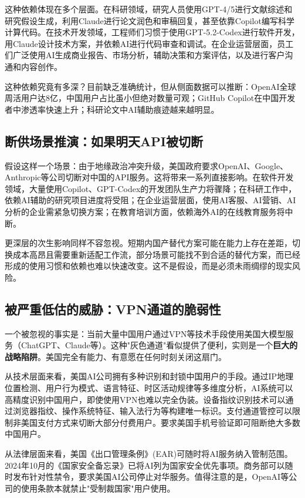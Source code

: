 这种依赖体现在多个层面。在科研领域，研究人员使用GPT-4/5进行文献综述和研究假设生成，利用Claude进行论文润色和审稿回复，甚至依靠Copilot编写科学计算代码。在技术开发领域，工程师们习惯于使用GPT-5.2-Codex进行软件开发，用Claude设计技术方案，并依赖AI进行代码审查和调试。在企业运营层面，员工们广泛使用AI生成商业报告、市场分析，辅助决策和方案评估，以及进行客户沟通和内容创作。

这种依赖究竟有多深？目前缺乏准确统计，但从侧面数据可以推断：OpenAI全球周活用户达8亿，中国用户占比虽小但绝对数量可观；GitHub Copilot在中国开发者中渗透率快速上升；科研论文中AI辅助痕迹越来越明显。

\subsection{断供场景推演：如果明天API被切断}

假设这样一个场景：由于地缘政治冲突升级，美国政府要求OpenAI、Google、Anthropic等公司切断对中国的API服务。这将带来一系列直接影响。在软件开发领域，大量使用Copilot、GPT-Codex的开发团队生产力将骤降；在科研工作中，依赖AI辅助的研究项目进度将受阻；在企业运营层面，使用AI客服、AI营销、AI分析的企业需紧急切换方案；在教育培训方面，依赖海外AI的在线教育服务将中断。

更深层的次生影响同样不容忽视。短期内国产替代方案可能在能力上存在差距，切换成本高昂且需要重新适配工作流，部分场景可能找不到合适的替代方案，而已经形成的使用习惯和依赖也难以快速改变。这不是假设，而是必须未雨绸缪的现实风险。

\subsection{被严重低估的威胁：VPN通道的脆弱性}

一个被忽视的事实是：当前大量中国用户通过VPN等技术手段使用美国大模型服务（ChatGPT、Claude等）。这种"灰色通道"看似提供了便利，实则是一个\textbf{巨大的战略陷阱}。美国完全有能力、有意愿在任何时刻关闭这扇门。

从技术层面来看，美国AI公司拥有多种识别和封锁中国用户的手段。通过IP地理位置检测、用户行为模式、语言特征、时区活动规律等多维度分析，AI系统可以高精度识别中国用户，即使使用VPN也难以完全伪装。设备指纹识别技术可以通过浏览器指纹、操作系统特征、输入法行为等构建唯一标识。支付通道管控可以限制非美国支付方式来切断大部分付费用户。要求美国手机号验证即可阻断绝大多数中国用户。

从法律层面来看，美国《出口管理条例》(EAR)可随时将AI服务纳入管制范围。2024年10月的《国家安全备忘录》已将AI列为国家安全优先事项。商务部可以随时发布针对性禁令，要求美国AI公司停止对华服务。值得注意的是，OpenAI等公司的使用条款本就禁止"受制裁国家"用户使用。


